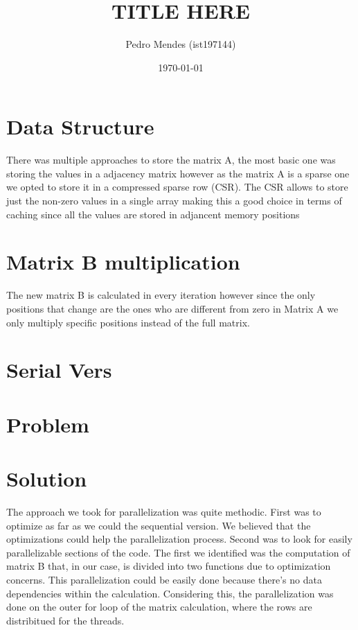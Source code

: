 \documentclass[a4paper]{article}
\begin{document}
\title{TITLE HERE} %
\author{Pedro Mendes (ist197144)}
\date{\today}
\maketitle

\section{Data Structure}
There was multiple approaches to store the matrix A, the most basic one was storing the values in a adjacency matrix however as the matrix A is a sparse one we opted to store it in a compressed sparse row (CSR). The CSR allows to store just the non-zero values in a single array making this a good choice in terms of caching since all the values are stored in adjancent memory positions

\section{Matrix B multiplication}
The new matrix B is calculated in every iteration however since the only positions that change are the ones who are different from zero in Matrix A we only multiply specific positions instead of the full matrix.
\section{Serial Vers}

\section{Problem}

\section{Solution}




The approach we took for parallelization was quite methodic. First was to optimize as 
far as we could the sequential version. We believed that the optimizations could help the
parallelization process. Second was to look for easily parallelizable sections of the code.
The first we identified was the computation of matrix B that, in our case, is divided into
two functions due to optimization concerns. %
This parallelization could be easily done because there's no data dependencies within the 
calculation. Considering this, the parallelization was done on the outer for loop of the 
matrix calculation, where the rows are distribitued for the threads.
\end{document}

